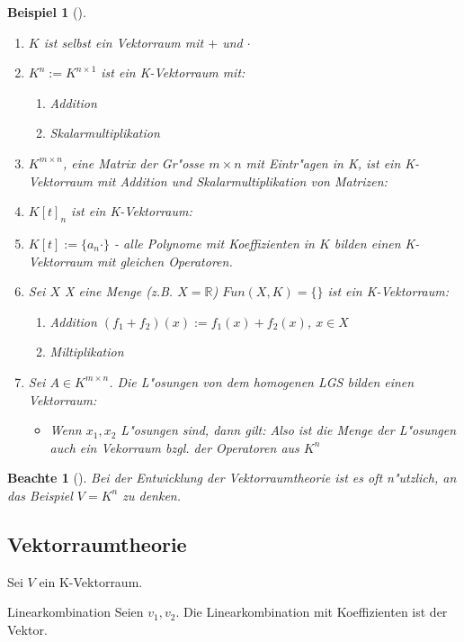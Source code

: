 \documentclass[11pt]{article}
\newtheorem{exa}{Beispiel}[section]
\newtheorem*{notte}{Beachte}
\begin{document}
\begin{exa}[] \label{}
\begin{enumerate}
\item \(K\) ist selbst ein Vektorraum mit \(+\) und \(\cdot\)
\item \(K^{n}:=K^{n\times 1}\) ist ein K-Vektorraum mit:
\begin{enumerate}
\item Addition
\item Skalarmultiplikation
\end{enumerate}
\item \(K^{m \times n}\), eine Matrix der Gr"osse \(m\times n\) mit Eintr"agen in K,
ist ein K-Vektorraum mit Addition und Skalarmultiplikation von Matrizen:
\item \(K[t]_n\) ist ein K-Vektorraum:
\item \(K[t]:=\{a_n\cdot \}\) - alle Polynome mit Koeffizienten in \(K\) bilden einen
K-Vektorraum mit gleichen Operatoren.
\item Sei \(X\) X eine Menge (z.B. \(X=\mathbb{R}\)) \(Fun(X,K)=\{\}\) ist ein K-Vektorraum:
\begin{enumerate}
\item Addition \((f_1 + f_2)(x):= f_1(x)+ f_2(x)\), \(x\in X\)
\item Miltiplikation
\end{enumerate}
\item Sei \(A\in K^{m\times n}\). Die L"osungen von dem homogenen LGS bilden einen
Vektorraum:
\begin{itemize}
\item Wenn \(x_1,x_2\) L"osungen sind, dann gilt: Also ist die Menge der
L"osungen auch ein Vekorraum bzgl. der Operatoren aus \(K^n\)
\end{itemize}
\end{enumerate}
\end{exa}

\begin{notte}[] \label{}
Bei der Entwicklung der Vektorraumtheorie ist es oft n"utzlich, an das Beispiel
\(V=K^n\) zu denken.
\end{notte}

\subsection{Vektorraumtheorie}
\label{sec:org432e282}
Sei \(V\) ein K-Vektorraum.

\begin{definition}{Linearkombination}{}
Seien \(v_1, v_2\). Die Linearkombination mit Koeffizienten ist der Vektor.
\end{definition}
\end{document}
